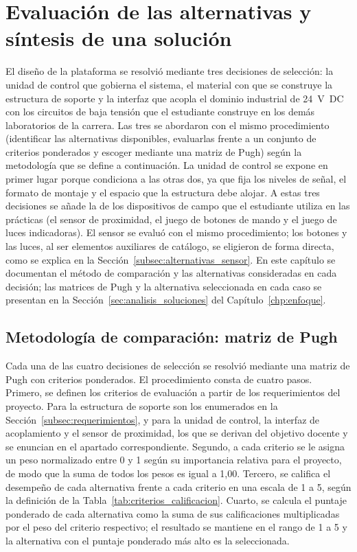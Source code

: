 \documentclass[12pt,a4paper,oneside]{report}
\begin{document}
\section{Evaluación de las alternativas y síntesis de una solución}

El diseño de la plataforma se resolvió mediante tres decisiones de selección: la unidad de control que gobierna el sistema, el material con que se construye la estructura de soporte y la interfaz que acopla el dominio industrial de 24~V~DC con los circuitos de baja tensión que el estudiante construye en los demás laboratorios de la carrera. Las tres se abordaron con el mismo procedimiento (identificar las alternativas disponibles, evaluarlas frente a un conjunto de criterios ponderados y escoger mediante una matriz de Pugh) según la metodología que se define a continuación. La unidad de control se expone en primer lugar porque condiciona a las otras dos, ya que fija los niveles de señal, el formato de montaje y el espacio que la estructura debe alojar. A estas tres decisiones se añade la de los dispositivos de campo que el estudiante utiliza en las prácticas (el sensor de proximidad, el juego de botones de mando y el juego de luces indicadoras). El sensor se evaluó con el mismo procedimiento; los botones y las luces, al ser elementos auxiliares de catálogo, se eligieron de forma directa, como se explica en la Sección~\ref{subsec:alternativas_sensor}. En este capítulo se documentan el método de comparación y las alternativas consideradas en cada decisión; las matrices de Pugh y la alternativa seleccionada en cada caso se presentan en la Sección~\ref{sec:analisis_soluciones} del Capítulo~\ref{chp:enfoque}.


\subsection{Metodología de comparación: matriz de Pugh}
\label{subsec:escala}

Cada una de las cuatro decisiones de selección se resolvió mediante una matriz de Pugh con criterios ponderados. El procedimiento consta de cuatro pasos. Primero, se definen los criterios de evaluación a partir de los requerimientos del proyecto. Para la estructura de soporte son los enumerados en la Sección~\ref{subsec:requerimientos}, y para la unidad de control, la interfaz de acoplamiento y el sensor de proximidad, los que se derivan del objetivo docente y se enuncian en el apartado correspondiente. Segundo, a cada criterio se le asigna un peso normalizado entre 0 y 1 según su importancia relativa para el proyecto, de modo que la suma de todos los pesos es igual a 1{,}00. Tercero, se califica el desempeño de cada alternativa frente a cada criterio en una escala de 1 a 5, según la definición de la Tabla~\ref{tab:criterios_calificacion}. Cuarto, se calcula el puntaje ponderado de cada alternativa como la suma de sus calificaciones multiplicadas por el peso del criterio respectivo; el resultado se mantiene en el rango de 1 a 5 y la alternativa con el puntaje ponderado más alto es la seleccionada.
\end{document}
